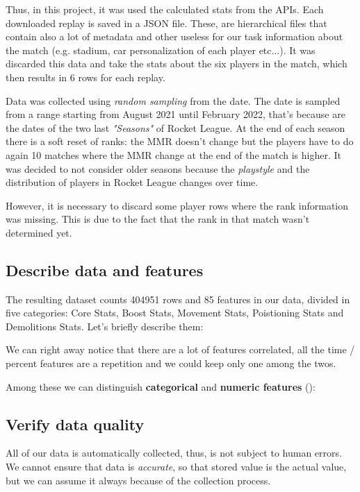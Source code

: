 Thus, in this project, it was used the calculated stats from the APIs. Each downloaded replay is saved in a JSON file. These, are hierarchical files that contain also a lot of metadata and other useless for our task information about the match (e.g. stadium, car personalization of each player etc...). It was discarded this data and take the stats about the six players in the match, which then results in 6 rows for each replay.

Data was collected using \textit{random sampling} from the date. The date is sampled from a range starting from August 2021 until February 2022, that's because are the dates of the two last \textit{"Seasons"} of Rocket League. At the end of each season there is a soft reset of ranks: the MMR doesn't change but the players have to do again 10 matches where the MMR change at the end of the match is higher.
It was decided to not consider older seasons because the \textit{playstyle} and the distribution of players in Rocket League changes over time.

However, it is necessary to discard some player rows where the rank information was missing. This is due to the fact that the rank in that match wasn't determined yet.

\subsection{Describe data and features}

The resulting dataset counts 404951 rows and 85 features in our data, divided in five categories: Core Stats, Boost Stats, Movement Stats, Poistioning Stats and Demolitions Stats. Let's briefly describe them:



We can right away notice that there are a lot of features correlated, all the time / percent features are a repetition and we could keep only one among the twos.

Among these we can distinguish \textbf{categorical} and \textbf{numeric features} ():



\subsection{Verify data quality}

All of our data is automatically collected, thus, is not subject to human errors.
We cannot ensure that data is \textit{accurate}, so that stored value is the actual value, but we can assume it always because of the collection process.


